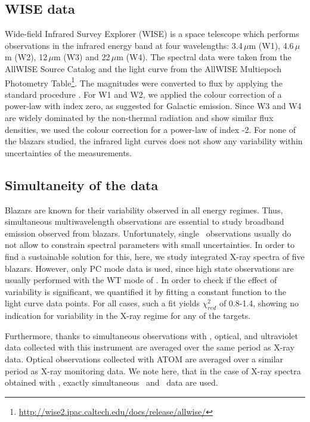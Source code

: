 \subsection*{WISE data}
Wide-field Infrared Survey Explorer (WISE) is a space telescope which performs observations in the infrared energy band at four wavelengths: 3.4\,$\mu$m (W1), 4.6\,$\mu$m (W2), 12\,$\mu$m (W3) and 22\,$\mu$m (W4). The spectral data were taken from the AllWISE Source Catalog and the light curve from the AllWISE Multiepoch Photometry Table\footnote{\url{http://wise2.ipac.caltech.edu/docs/release/allwise/}}. The magnitudes were converted to flux by applying the standard procedure \citep{Wright_2010}. For W1 and W2, we applied the colour correction of a power-law with index zero, as suggested for  Galactic emission. Since W3 and W4 are widely dominated by the non-thermal radiation and show similar flux densities, we used the colour correction for a power-law of index -2.
For none of the blazars studied, the infrared light curves does not show any  variability within uncertainties of the measurements.

\subsection{Simultaneity of the data}

Blazars are known for their variability observed in all energy regimes. 
Thus, simultaneous multiwavelength observations are essential to study broadband emission observed from blazars.
Unfortunately, single \xrt\ observations usually do not allow to constrain spectral parameters with small uncertainties.
In order to find a sustainable solution for this, here, we study  integrated X-ray spectra of five blazars.
However, only PC mode data is used, since high state observations are usually performed with the WT mode of \xrt.
In order to check if the effect of variability is significant, we quantified it by fitting a constant function to the light curve data points. 
For all cases, such a fit yields $\chi_{red}^2$ of 0.8-1.4,  showing no indication for variability in the X-ray regime for any of the targets.


Furthermore, thanks to simultaneous observations with \uvot, optical, and ultraviolet data collected with this instrument are averaged over the same period as X-ray data. 
Optical observations collected with ATOM are averaged over a similar period as X-ray monitoring data. 
We note here, that in the case of X-ray spectra obtained with \nus, exactly simultaneous \xrt\ and \uvot\ data are used. 








